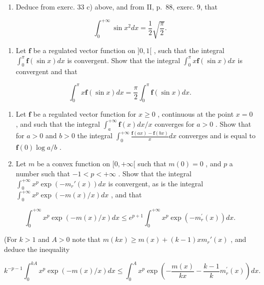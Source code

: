 \begin{enumerate}
\def\labelenumi{\arabic{enumi})}
\setcounter{enumi}{35}
\tightlist
\item
  Deduce from exerc. 33 c) above, and from II, p.~88, exerc. 9, that
\end{enumerate}

\[
\int_ {0} ^ {+ \infty} \sin x ^ {2} d x = \frac {1}{2} \sqrt {\frac {\pi}{2}}.
\]

\begin{enumerate}
\def\labelenumi{\arabic{enumi})}
\setcounter{enumi}{36}
\tightlist
\item
  Let \(\mathbf{f}\) be a regulated vector function on \(]0, 1[\) , such that the integral \(\int_0^\pi \mathbf{f}(\sin x) dx\) is convergent. Show that the integral \(\int_0^\pi x \mathbf{f}(\sin x) dx\) is convergent and that
\end{enumerate}

\[
\int_ {0} ^ {\pi} x \mathbf {f} (\sin x) d x = \frac {\pi}{2} \int_ {0} ^ {\pi} \mathbf {f} (\sin x) d x.
\]

\begin{enumerate}
\def\labelenumi{\arabic{enumi})}
\setcounter{enumi}{37}
\item
  Let \(\mathbf{f}\) be a regulated vector function for \(x \geqslant 0\) , continuous at the point \(x = 0\) , and such that the integral \(\int_{a}^{+\infty} \mathbf{f}(x) dx / x\) converges for \(a > 0\) . Show that for \(a > 0\) and \(b > 0\) the integral \(\int_{0}^{+\infty} \frac{\mathbf{f}(ax) - \mathbf{f}(bx)}{x} dx\) converges and is equal to \(\mathbf{f}(0) \log a / b\) .
\item
  Let \(m\) be a convex function on \([0, +\infty[\) such that \(m(0) = 0\) , and \(p\) a number such that \(-1 < p < +\infty\) . Show that the integral \(\int_0^{+\infty} x^p \exp(-m_r'(x)) dx\) is convergent, as is the integral \(\int_0^{+\infty} x^p \exp(-m(x)/x) dx\) , and that
\end{enumerate}

\[
\int_ {0} ^ {+ \infty} x ^ {p} \exp (- m (x) / x) d x \leqslant e ^ {p + 1} \int_ {0} ^ {+ \infty} x ^ {p} \exp (- m _ {r} ^ {\prime} (x)) d x.
\]

(For \(k > 1\) and \(A > 0\) note that \(m(kx) \geqslant m(x) + (k - 1)x m_r'(x)\) , and deduce the inequality

\[
k ^ {- p - 1} \int_ {0} ^ {k A} x ^ {p} \exp (- m (x) / x) d x \leqslant \int_ {0} ^ {A} x ^ {p} \exp \left(- \frac {m (x)}{k x} - \frac {k - 1}{k} m _ {r} ^ {\prime} (x)\right) d x.
\]

